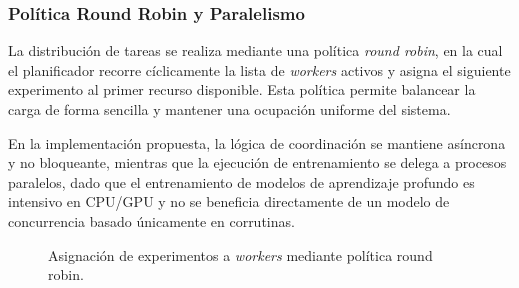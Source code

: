 \documentclass[conference]{IEEEtran}
\begin{document}
\subsubsection{Política Round Robin y Paralelismo}

La distribución de tareas se realiza mediante una política \emph{round robin}, en la cual el planificador recorre cíclicamente la lista de \emph{workers} activos y asigna el siguiente experimento al primer recurso disponible. Esta política permite balancear la carga de forma sencilla y mantener una ocupación uniforme del sistema.

En la implementación propuesta, la lógica de coordinación se mantiene asíncrona y no bloqueante, mientras que la ejecución de entrenamiento se delega a procesos paralelos, dado que el entrenamiento de modelos de aprendizaje profundo es intensivo en CPU/GPU y no se beneficia directamente de un modelo de concurrencia basado únicamente en corrutinas.

\begin{figure}[!t]
\centering
{}
\caption{Asignación de experimentos a \emph{workers} mediante política round robin.}
\label{fig:round_robin}
\end{figure}
\end{document}
